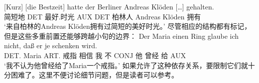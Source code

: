 \ex 
\gll {}[Kurz] [die Bestzeit] hatte der Berliner Andreas Klöden [\ldots] gehalten.\footnotemark\\
	 \spacebr{}简短地 \spacebr{}DET 最好.时光 AUX DET 柏林人 Andreas Klöden {} 拥有\\
\label{bsp-kurz-die-bestzeit}     
\glt `来自柏林的Andreas Klöden拥有过简短的美好时光。'
\zl
尽管相应的结构都有标记，但是这些多重前置还能够跨越小句的边界：
\ea 
\gll Der        Maria einen    Ring glaube  ich nicht, daß  er je   schenken wird.\footnotemark\\
     DET.\dat{} Maria ART.\acc{} 戒指 相信 我   不    CONJ 他 曾经 给     AUX\\
\glt `我不认为他曾经给了Maria一个戒指。'
\z
如果允许了这种依存关系，要限制它们就十分困难了。这里不便讨论细节问题，但是读者可以参考。

